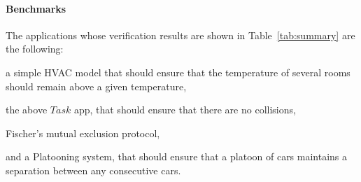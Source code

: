 \paragraph*{Benchmarks}
The applications whose verification results are shown in Table~\ref{tab:summary} are the following:

\begin{inparaenum}[(i)]
\item a simple HVAC model that should ensure that the temperature of several rooms should remain above a  given temperature, 
\item  the above $\mathit{Task}$ app, that should ensure that there are no collisions, 
\item Fischer's mutual exclusion protocol, 
\item and a Platooning system, that should ensure that a platoon of cars maintains a separation between any consecutive cars. 
\end{inparaenum}

